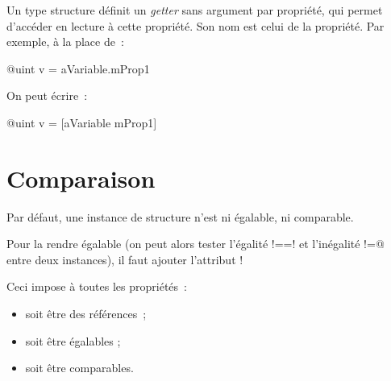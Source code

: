 %
%
%
%






Un type structure définit un \emph{getter} sans argument par propriété, qui permet d'accéder en lecture à cette propriété. Son nom est celui de la propriété. Par exemple, à la place de~:
\begin{galgas3}
@uint v = aVariable.mProp1
\end{galgas3}

On peut écrire~:
\begin{galgas3}
@uint v = [aVariable mProp1]
\end{galgas3}













\section{Comparaison}

Par défaut, une instance de structure n'est ni égalable, ni comparable.

Pour la rendre égalable (on peut alors tester l'égalité \ggsq!==! et l'inégalité \ggsq@!=@ entre deux instances), il faut ajouter l'attribut \ggsq!%


Ceci impose à toutes les propriétés~:
\begin{itemize}
  \item soit être des références~;
  \item soit être égalables ;
  \item soit être comparables.
\end{itemize}




